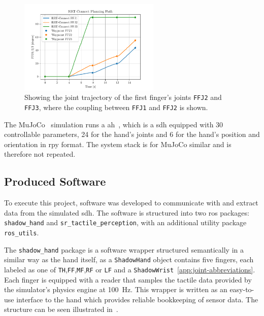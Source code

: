 \begin{figure}[!h]
		\begin{center}
			\includegraphics[width=0.6\textwidth]{chapters/system-setup/fig/q-angles.pdf}
		\end{center}
		\caption{Showing the joint trajectory of the first finger's joints \texttt{FFJ2} and \texttt{FFJ3}, where the coupling between \texttt{FFJ1} and \texttt{FFJ2} is shown.}
		\label{fig:coupling-and-planning-graph}
\end{figure}

The MuJoCo~\cite{todorov2012mujoco} simulation runs a \gls{ah}~\cite{learning-complex-dexterous-manipulation-with-deep-reinforcement-learning-and-demonstrations}, which is a \gls{sdh} equipped with \num{30} controllable parameters, \num{24} for the hand's joints and \num{6} for the hand's position  and orientation  in \gls{rpy} format. The system stack is for MuJoCo similar and is therefore not repeated. \medskip


\subsection{Produced Software}\label{sec:system-setup-simulation-setup-produced}

To execute this project, software was developed to communicate with and extract data from the simulated \gls{sdh}. The software is structured into two \gls{ros} packages: \texttt{shadow\_hand} and \texttt{sr\_tactile\_perception}, with an additional utility package \texttt{ros\_utils}. \medskip

The \texttt{shadow\_hand} package is a software wrapper structured semantically in a similar way as the hand itself, as a \texttt{ShadowHand} object contains five fingers, each labeled as one of \texttt{TH},\texttt{FF},\texttt{MF},\texttt{RF} or \texttt{LF} and a \texttt{ShadowWrist}~\ref{app:joint-abbreviations}. Each finger is equipped with a reader that samples the tactile data provided by the simulator's physics engine at \SI{100}{\hertz}. This wrapper is written as an easy-to-use interface to the hand which provides reliable bookkeeping of sensor data. The structure can be seen illustrated in~. \medskip

